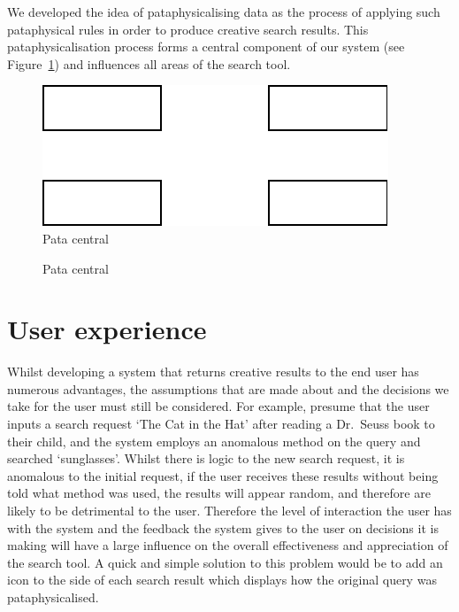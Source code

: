 We developed the idea of pataphysicalising data as the process of applying such pataphysical rules in order to produce creative search results. This pataphysicalisation process forms a central component of our system (see Figure~\ref{fig:patasearch01}) and influences all areas of the search tool.


\begin{figure}[htb] %
  \centering
  \includegraphics[width=\linewidth]{images/patasearch01}
\caption[Pata central]{Pata central}
\label{fig:patasearch01}
\end{figure}

\begin{figure}[htb] %
  \centering
  
\caption[Pata central]{Pata central}
\label{fig:patasearch02}
\end{figure}


\section{User experience}

Whilst developing a system that returns creative results to the end user has numerous advantages, the assumptions that are made about and the decisions we take for the user must still be considered. For example, presume that the user inputs a search request `The Cat in the Hat' after reading a Dr.\ Seuss book to their child, and the system employs an anomalous method on the query and searched `sunglasses'. Whilst there is logic to the new search request, it is anomalous to the initial request, if the user receives these results without being told what method was used, the results will appear random, and therefore are likely to be detrimental to the user. Therefore the level of interaction the user has with the system and the feedback the system gives to the user on decisions it is making will have a large influence on the overall effectiveness and appreciation of the search tool. A quick and simple solution to this problem would be to add an icon to the side of each search result which displays how the original query was pataphysicalised.

